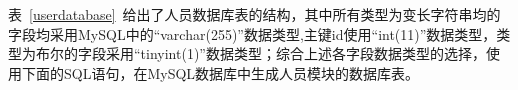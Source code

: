 表~\ref{userdatabase}~给出了人员数据库表的结构，其中所有类型为变长字符串均的字段均采用MySQL中的“varchar(255)”数据类型,主键id使用“int(11)”数据类型，类型为布尔的字段采用“tinyint(1)”数据类型；综合上述各字段数据类型的选择，使用下面的SQL语句，在MySQL数据库中生成人员模块的数据库表。

\noindent
\ttfamily
